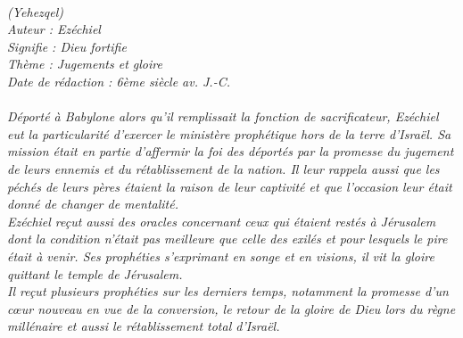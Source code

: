 \BFont
\noindent\hrulefill
{\footnotesize
\textit{
\bigskip
{\centering{}
\\(Yehezqel)
\\Auteur : Ezéchiel
\\Signifie : Dieu fortifie
\\Thème : Jugements et gloire
\\Date de rédaction : 6ème siècle av. J.-C.\\}
}
\textit{
\\Déporté à Babylone alors qu’il remplissait la fonction de sacrificateur, Ezéchiel eut la particularité d’exercer le ministère prophétique hors de la terre d’Israël. Sa mission était en partie d’affermir la foi des déportés par la promesse du jugement de leurs ennemis et du rétablissement de la nation. Il leur rappela aussi que les péchés de leurs pères étaient la raison de leur captivité et que l’occasion leur était donné de changer de mentalité.
\\Ezéchiel reçut aussi des oracles concernant ceux qui étaient restés à Jérusalem dont la condition n’était pas meilleure que celle des exilés et pour lesquels le pire était à venir.
Ses prophéties s’exprimant en songe et en visions, il vit la gloire quittant le temple de Jérusalem.
\\Il reçut plusieurs prophéties sur les derniers temps, notamment la promesse d’un cœur nouveau en vue de la conversion, le retour de la gloire de Dieu lors du règne millénaire et aussi le rétablissement total d’Israël.\bigskip
}
}
\par\nobreak\noindent\hrulefill
